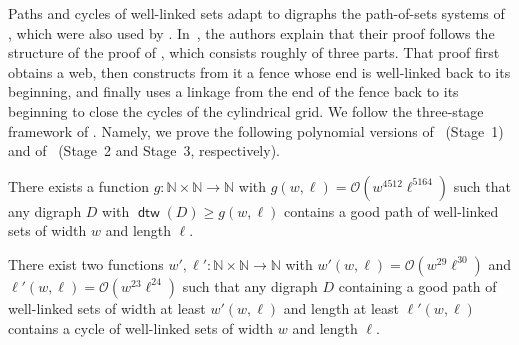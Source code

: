 \documentclass[fontsize=12pt,leading=14pt]{fullpaper}
\DeclareMathOperator{\dtw}{\mathsf{dtw}}
\newcommand{\Kcal}{\mathcal{K}}
\newcommand{\Ocal}{\mathcal{O}}
\newcommand{\Pcal}{\mathcal{P}}
\newcommand{\Scal}{\mathcal{S}}
\newcommand{\NN}{\mathbb{N}}
\begin{document}
Paths and cycles of well-linked sets adapt to digraphs the path-of-sets systems of \textcite{CC16}, which were also used by \textcite{CT21}.
In~\cite[Section~1]{HKMM26a}, the authors explain that their proof follows the structure of the proof of \textcite{KawarabayashiK15}, which consists roughly of three parts.
That proof first obtains a web, then constructs from it a fence whose end is well-linked back to its beginning, and finally uses a linkage from the end of the fence back to its beginning to close the cycles of the cylindrical grid.
We follow the three-stage framework of \textcite{HKMM26a,HKMM26b}.
Namely, we prove the following polynomial versions of~\cite[Theorem~9.9]{HKMM26a} (Stage~1) and of~\cite[theorems~1.2 and~3.18]{HKMM26b} (Stage~2 and Stage~3, respectively).

\begin{theorem}\label{thm:intro-stage1}
  There exists a function $g \colon \NN \times \NN \to \NN$ with $g(w, \ell) = \Ocal(w^{4512} \ell^{5164})$ such that any digraph $D$ with $\dtw(D) \ge g(w, \ell)$ contains a good path of well-linked sets of width $w$ and length $\ell$.
\end{theorem}

\begin{theorem}\label{thm:intro-stage2}
  There exist two functions $w', \ell' \colon \NN \times \NN \to \NN$ with $w'(w, \ell) = \Ocal(w^{29} \ell^{30})$ and $\ell'(w, \ell) = \Ocal(w^{23} \ell^{24})$ such that any digraph $D$ containing a good path of well-linked sets of width at least $w'(w, \ell)$ and length at least $\ell'(w, \ell)$ contains a cycle of well-linked sets of width $w$ and length $\ell$.
\end{theorem}
\end{document}
